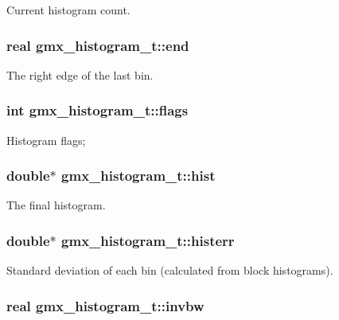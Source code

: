 \-Current histogram count. \hypertarget{structgmx__histogram__t_aa2010aa4ba4421c82206f618eaa12e94}{
\subsubsection[{end}]{\setlength{\rightskip}{0pt plus 5cm}real {\bf gmx\-\_\-histogram\-\_\-t\-::end}}}\label{structgmx__histogram__t_aa2010aa4ba4421c82206f618eaa12e94}
\-The right edge of the last bin. \hypertarget{structgmx__histogram__t_a276a8c03a110d680458e3ceb5afaeddd}{
\subsubsection[{flags}]{\setlength{\rightskip}{0pt plus 5cm}int {\bf gmx\-\_\-histogram\-\_\-t\-::flags}}}\label{structgmx__histogram__t_a276a8c03a110d680458e3ceb5afaeddd}
\-Histogram flags; \hypertarget{structgmx__histogram__t_ab24cdf5087598ca2c507dc629e181a4c}{
\subsubsection[{hist}]{\setlength{\rightskip}{0pt plus 5cm}double$\ast$ {\bf gmx\-\_\-histogram\-\_\-t\-::hist}}}\label{structgmx__histogram__t_ab24cdf5087598ca2c507dc629e181a4c}
\-The final histogram. \hypertarget{structgmx__histogram__t_a97c7e2db1a468ee0aa730077ff417c75}{
\subsubsection[{histerr}]{\setlength{\rightskip}{0pt plus 5cm}double$\ast$ {\bf gmx\-\_\-histogram\-\_\-t\-::histerr}}}\label{structgmx__histogram__t_a97c7e2db1a468ee0aa730077ff417c75}
\-Standard deviation of each bin (calculated from block histograms). \hypertarget{structgmx__histogram__t_a2f553cb83745162629d5425ab51288e2}{
\subsubsection[{invbw}]{\setlength{\rightskip}{0pt plus 5cm}real {\bf gmx\-\_\-histogram\-\_\-t\-::invbw}}}\label{structgmx__histogram__t_a2f553cb83745162629d5425ab51288e2}
